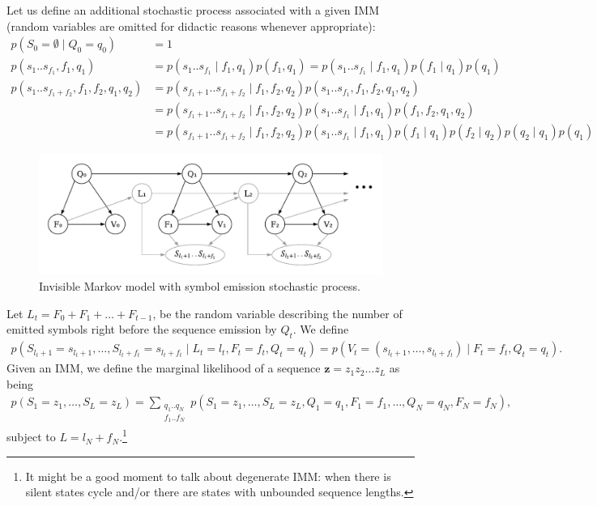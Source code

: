 \documentclass[a4paper]{article}
\theoremstyle{definition}
\theoremstyle{definition}
\theoremstyle{definition}
\newcommand{\gv}{\;|\;}
\begin{document}
Let us define an additional stochastic process  associated with a given IMM
(random variables are omitted for didactic reasons whenever appropriate):
\begin{align*}
    p(S_0=\emptyset\gv Q_0=q_0)
        &=1\\
    p(s_1 .. s_{f_1},f_1,q_1)
        &= p(s_1 .. s_{f_1}\gv f_1,q_1)p(f_1,q_1) = p(s_1 .. s_{f_1}\gv f_1,q_1)p(f_1\gv q_1)p(q_1)\\
    p(s_1 .. s_{f_1+f_2},f_1,f_2,q_1,q_2)
        &= p(s_{f_1+1} .. s_{f_1+f_2}\gv f_1, f_2, q_2)p(s_1 .. s_{f_1}, f_1, f_2, q_1, q_2)\\
        &= p(s_{f_1+1} .. s_{f_1+f_2}\gv f_1, f_2, q_2)p(s_1 .. s_{f_1}\gv f_1, q_1) p(f_1, f_2, q_1, q_2)\\
        &= p(s_{f_1+1} .. s_{f_1+f_2}\gv f_1, f_2, q_2)p(s_1 .. s_{f_1}\gv f_1, q_1) p(f_1\gv q_1) p(f_2\gv q_2)p(q_2\gv q_1)p(q_1)
\end{align*}

\begin{figure}[htbp]
\centering
\includegraphics[width=.6\linewidth]{imm-s}
\caption{Invisible Markov model with symbol emission stochastic process.}%
\label{fig:imm-s}
\end{figure}

Let $L_t=F_0+F_1+\dots + F_{t-1}$, be the random variable describing the number of emitted symbols right
before the sequence emission by $Q_t$.
We define
\begin{align*}
    p(S_{l_t+1}=s_{l_t+1}, \dots, S_{l_t+f_t}=s_{l_t+f_t} \gv L_t=l_t, F_t=f_t, Q_t=q_t) =
                                p(V_t=(s_{l_t+1}, \dots, s_{l_t+f_t}) \gv F_t=f_t, Q_t=q_t).
\end{align*}
Given an IMM, we define the marginal likelihood of a sequence $\mathbf z = z_1z_2\dots z_L$
as being
\begin{align*}
    p(S_1=z_1, \dots, S_L=z_L) = \sum\limits_{\substack{q_1..q_N \\ f_1..f_N}}
        p(S_1=z_1, \dots, S_L=z_L, Q_1=q_1, F_1=f_1, \dots, Q_N=q_N, F_N=f_N),
\end{align*}
subject to $L=l_N+f_N$.\footnote{It might be a good moment to talk about degenerate IMM: when there is silent states cycle and/or
there are states with unbounded sequence lengths.}
\end{document}
